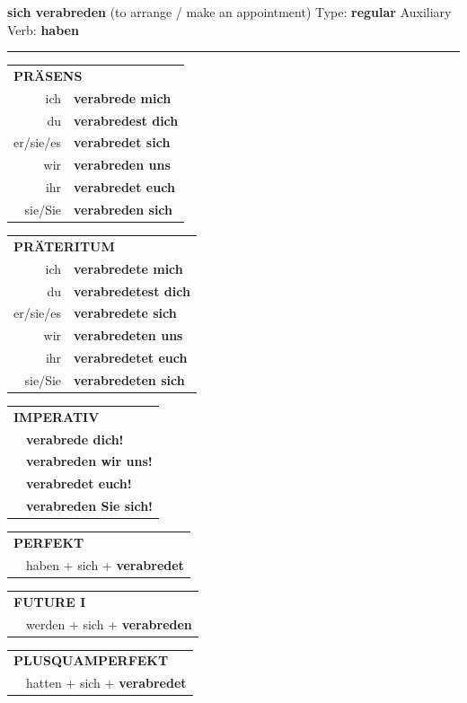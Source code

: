 \documentclass[10pt,a4paper]{revtex4-2}
\begin{document}
\begin{verbbox}
{\Large \bf sich verabreden} (to arrange / make an appointment) \hfill Type: \textbf{regular} \hfill Auxiliary Verb: \textbf{haben}

\vspace{5pt}
\hrule
\vspace{5pt}

\begin{tabular}{rl}
\multicolumn{2}{l}{\textbf{PRÄSENS}}\\
ich & \textbf{verabrede mich}\\
du & \textbf{verabredest dich}\\
er/sie/es & \textbf{verabredet sich}\\
wir & \textbf{verabreden uns}\\
ihr & \textbf{verabredet euch}\\
sie/Sie & \textbf{verabreden sich}\\
\end{tabular}
\hfill
\begin{tabular}{rl}
\multicolumn{2}{l}{\textbf{PRÄTERITUM}}\\
ich & \textbf{verabredete mich}\\
du & \textbf{verabredetest dich}\\
er/sie/es & \textbf{verabredete sich}\\
wir & \textbf{verabredeten uns}\\
ihr & \textbf{verabredetet euch}\\
sie/Sie & \textbf{verabredeten sich}\\
\end{tabular}
\hfill
\begin{tabular}{rl}
\multicolumn{2}{l}{\textbf{IMPERATIV}}\\
& \textbf{verabrede dich!}\\
& \textbf{verabreden wir uns!}\\
& \textbf{verabredet euch!}\\
& \textbf{verabreden Sie sich!}\\
\end{tabular}

\vspace{10pt}

\begin{tabular}{rl}
\multicolumn{2}{l}{\textbf{PERFEKT}}\\
& haben + sich + \textbf{verabredet}\\
\end{tabular}
\hfill
\begin{tabular}{rl}
\multicolumn{2}{l}{\textbf{FUTURE I}}\\
& werden + sich + \textbf{verabreden}\\
\end{tabular}
\hfill
\begin{tabular}{rl}
\multicolumn{2}{l}{\textbf{PLUSQUAMPERFEKT}}\\
& hatten + sich + \textbf{verabredet}\\
\end{tabular}


\end{verbbox}
\end{document}
